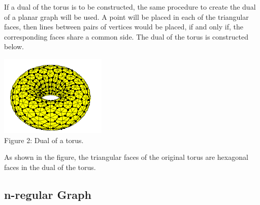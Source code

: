 \documentclass[12pt]{article}
\begin{document}
\begin{flushleft}
\medskip
If a dual of the torus is to be constructed, the same procedure to create the dual of a planar graph will be used. A point will be placed in each of the triangular faces, then lines between pairs of vertices would be placed, if and only if, the corresponding faces share a common side. The dual of the torus is constructed below.

\begin{center}
\includegraphics[scale=1.25]{images/torus2.png}\\
Figure 2: Dual of a torus.
\end{center}

As shown in the figure, the triangular faces of the original torus are hexagonal faces in the dual of the torus.

\subsection*{n-regular Graph}

\end{flushleft}
\end{document}
